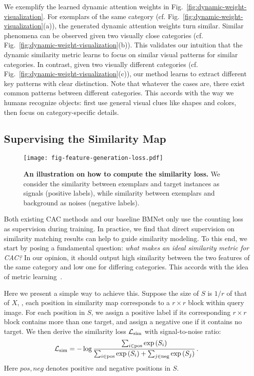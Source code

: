 \documentclass[10pt,twocolumn,letterpaper]{article}
\begin{document}
We exemplify the learned dynamic attention weights in Fig.~\ref{fig:dynamic-weight-visualization}. For exemplars of the same category (cf. Fig.~\ref{fig:dynamic-weight-visualization}(a)), the generated dynamic attention weights turn similar. Similar phenomena can be observed given two visually close categories (cf. Fig.~\ref{fig:dynamic-weight-visualization}(b)). This validates our intuition that the dynamic similarity metric learns to focus on similar visual patterns for similar categories. In contrast, given two visually different categories (cf. Fig.~\ref{fig:dynamic-weight-visualization}(c)), our method learns to extract different key patterns with clear distinction. Note that whatever the cases are, there exist common patterns between different categories. This accords with the way we humans recognize objects: first use general visual clues like shapes and colors, then focus on category-specific details. 

\subsection{Supervising the Similarity Map}

\begin{figure}[!t]
  \centering
   \texttt{[image: fig-feature-generation-loss.pdf]}\vspace{-5pt}
   \caption{\textbf{An illustration on how to compute the similarity loss.} We consider the similarity between exemplars and target instances as signals (positive labels), while similarity between exemplars and background as noises (negative labels).}
   \label{fig:feature-generation-loss}
   \vspace{-5pt}
\end{figure}

Both existing CAC methods and our baseline BMNet only use the counting loss as supervision during training. In practice, we find that direct supervision on similarity matching results can help to guide similarity modeling. To this end, we start by posing a fundamental question: \textit{what makes an ideal similarity metric for CAC?} In our opinion, it should output high similarity between the two features of the same category and low one for differing categories. This accords with the idea of metric learning~\cite{metric_learning_reality_check}.

Here we present a simple way to achieve this. Suppose the size of $S$ is $1/r$ of that of $X$, \ie, each position in similarity map corresponds to a $r\times r$ block within query image. For each position in $S$, we assign a positive label if its corresponding $r\times r$ block contains more than one target, and assign a negative one if it contains no target. We then derive the similarity loss $\mathcal{L}_{\rm sim}$ with signal-to-noise ratio:
\begin{equation}
\mathcal{L}_{\rm sim} =-\log \frac{\sum_{i\in\rm pos}{\exp \left(S_i\right)}}{\sum_{i\in\rm pos}{\exp \left( S_i \right)}+\sum_{j\in\rm neg}{\exp \left(S_j \right)}}\,.
\end{equation}
Here $pos, neg$ denotes positive and negative positions in $S$.
\end{document}
